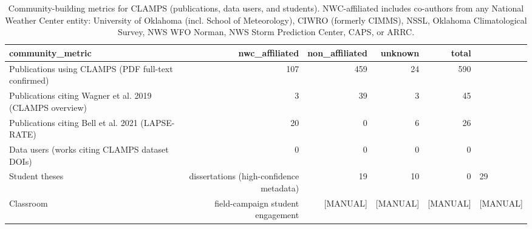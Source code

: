 \begin{table}[ht]
\centering
\caption{Community-building metrics for CLAMPS (publications, data users, and students). NWC-affiliated includes co-authors from any National Weather Center entity: University of Oklahoma (incl. School of Meteorology), CIWRO (formerly CIMMS), NSSL, Oklahoma Climatological Survey, NWS WFO Norman, NWS Storm Prediction Center, CAPS, or ARRC.}
\label{tab:community}
\small
\begin{tabular}{lrrrr}
\hline
community\_metric & nwc\_affiliated & non\_affiliated & unknown & total \\
\hline
Publications using CLAMPS (PDF full-text confirmed) & 107 & 459 & 24 & 590 \\
Publications citing Wagner et al. 2019 (CLAMPS overview) & 3 & 39 & 3 & 45 \\
Publications citing Bell et al. 2021 (LAPSE-RATE) & 20 & 0 & 6 & 26 \\
Data users (works citing CLAMPS dataset DOIs) & 0 & 0 & 0 & 0 \\
Student theses & dissertations (high-confidence metadata) & 19 & 10 & 0 & 29 \\
Classroom & field-campaign student engagement & [MANUAL] & [MANUAL] & [MANUAL] & [MANUAL] \\
\hline
\end{tabular}
\end{table}